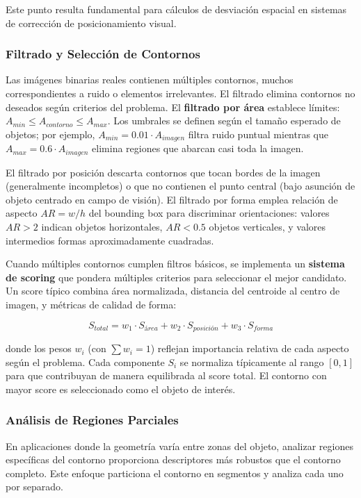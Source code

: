 Este punto resulta fundamental para cálculos de desviación espacial en sistemas de corrección de posicionamiento visual.

\subsubsection{Filtrado y Selección de Contornos}

Las imágenes binarias reales contienen múltiples contornos, muchos correspondientes a ruido o elementos irrelevantes. El filtrado elimina contornos no deseados según criterios del problema. El \textbf{filtrado por área} establece límites: $A_{min} \leq A_{contorno} \leq A_{max}$. Los umbrales se definen según el tamaño esperado de objetos; por ejemplo, $A_{min} = 0.01 \cdot A_{imagen}$ filtra ruido puntual mientras que $A_{max} = 0.6 \cdot A_{imagen}$ elimina regiones que abarcan casi toda la imagen.

El filtrado por posición descarta contornos que tocan bordes de la imagen (generalmente incompletos) o que no contienen el punto central (bajo asunción de objeto centrado en campo de visión). El filtrado por forma emplea relación de aspecto $AR = w/h$ del bounding box para discriminar orientaciones: valores $AR > 2$ indican objetos horizontales, $AR < 0.5$ objetos verticales, y valores intermedios formas aproximadamente cuadradas.

Cuando múltiples contornos cumplen filtros básicos, se implementa un \textbf{sistema de scoring} que pondera múltiples criterios para seleccionar el mejor candidato. Un score típico combina área normalizada, distancia del centroide al centro de imagen, y métricas de calidad de forma:

\begin{equation}
S_{total} = w_1 \cdot S_{área} + w_2 \cdot S_{posición} + w_3 \cdot S_{forma}
\end{equation}

donde los pesos $w_i$ (con $\sum w_i = 1$) reflejan importancia relativa de cada aspecto según el problema. Cada componente $S_i$ se normaliza típicamente al rango $[0,1]$ para que contribuyan de manera equilibrada al score total. El contorno con mayor score es seleccionado como el objeto de interés.

\subsubsection{Análisis de Regiones Parciales}

En aplicaciones donde la geometría varía entre zonas del objeto, analizar regiones específicas del contorno proporciona descriptores más robustos que el contorno completo. Este enfoque particiona el contorno en segmentos y analiza cada uno por separado.

